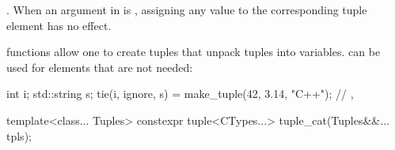 \begin{itemdescr}
\pnum
\returns
{}.  When an
argument in  is , assigning
any value to the corresponding tuple element has no effect.

\pnum
\begin{example}
 functions allow one to create tuples that unpack
tuples into variables.  can be used for elements that
are not needed:
\begin{codeblock}
int i; std::string s;
tie(i, ignore, s) = make_tuple(42, 3.14, "C++");
// , 
\end{codeblock}
\end{example}
\end{itemdescr}

\begin{itemdecl}
template<class... Tuples>
  constexpr tuple<CTypes...> tuple_cat(Tuples&&... tpls);
\end{itemdecl}

